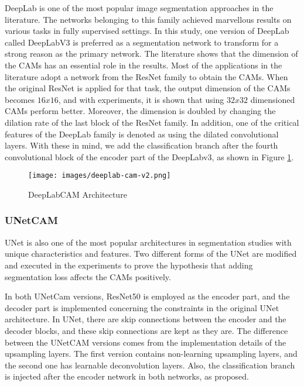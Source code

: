 \documentclass[sn-mathphys]{sn-jnl}
\theoremstyle{thmstyleone}
\theoremstyle{thmstyletwo}\newtheorem{example}{Example}\newtheorem{remark}{Remark}
\theoremstyle{thmstylethree}\newtheorem{definition}{Definition}
\begin{document}
DeepLab is one of the most popular image segmentation approaches in the literature. The networks belonging to this family achieved marvellous results on various tasks in fully supervised settings. In this study, one version of DeepLab called DeepLabV3 is preferred as a segmentation network to transform for a strong reason as the primary network. The literature shows that the dimension of the CAMs has an essential role in the results. Most of the applications in the literature adopt a network from the ResNet family to obtain the CAMs. When the original ResNet is applied for that task, the output dimension of the CAMs becomes \(16x16\), and with experiments, it is shown that using \(32x32\) dimensioned CAMs perform better.
Moreover, the dimension is doubled by changing the dilation rate of the last block of the ResNet family. In addition, one of the critical features of the DeepLab family is denoted as using the dilated convolutional layers. With these in mind, we add the classification branch after the fourth convolutional block of the encoder part of the DeepLabv3, as shown in  Figure \ref{deeplabcam_architecture}.

\begin{figure}[H]
    \centering
    \texttt{[image: images/deeplab-cam-v2.png]}
    \caption{DeepLabCAM Architecture}
    \label{deeplabcam_architecture}
\end{figure}


\subsubsection{UNetCAM}\label{unetcam_description}

UNet is also one of the most popular architectures in segmentation studies with unique characteristics and features. Two different forms of the UNet are modified and executed in the experiments to prove the hypothesis that adding segmentation loss affects the CAMs positively.

In both UNetCam versions, ResNet50 is employed as the encoder part, and the decoder part is implemented concerning the constraints in the original UNet architecture. In UNet, there are skip connections between the encoder and the decoder blocks, and these skip connections are kept as they are. The difference between the UNetCAM versions comes from the implementation details of the upsampling layers. The first version contains non-learning upsampling layers, and the second one has learnable deconvolution layers. Also, the classification branch is injected after the encoder network in both networks, as proposed.
\end{document}
